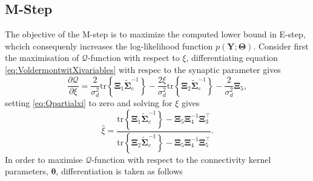 \documentclass[]{article}
\begin{document}
\subsection{M-Step}
The objective of the M-step is to maximize the computed lower bound in E-step, whcich consequenly increases the log-likelihood function $p(\mathbf Y;\boldsymbol\Theta)$.
                                                                                                                                                                                                                                                                                                                                                                                                                                                                            Consider first the maximisation of $\mathcal{Q}$-function with respect to $\xi$, differentiating equation \eqref{eq:VoldermontwitXivariables} with respec to the synaptic parameter gives
\begin{equation}\label{eq:Qpartialxi}
 \frac{\partial \mathcal Q}{\partial\xi}=\frac{2}{\sigma_d^2}\mathrm{tr}\left\lbrace \boldsymbol\Xi_1 \tilde{\boldsymbol\Sigma}_e^{-1}\right\rbrace -\frac{2\xi}{\sigma_d^2}\mathrm{tr}\left\lbrace \boldsymbol\Xi_2 \tilde{\boldsymbol\Sigma}_e^{-1}\right\rbrace-\frac{2}{\sigma_d^2}\boldsymbol\Xi_5,
\end{equation}
setting \eqref{eq:Qpartialxi} to zero and solving for $\xi$ gives
\begin{equation}\label{eq:xihat}
 \hat{\xi}=\frac{\mathrm{tr}\left\lbrace \boldsymbol\Xi_1 \tilde{\boldsymbol\Sigma}_e^{-1}\right\rbrace-\boldsymbol\Xi_5\boldsymbol\Xi_4^{-1}\boldsymbol\Xi_3^\top}{\mathrm{tr}\left\lbrace \boldsymbol\Xi_2 \tilde{\boldsymbol\Sigma}_e^{-1}\right\rbrace-\boldsymbol\Xi_5\boldsymbol\Xi_4^{-1}\boldsymbol\Xi_5^{\top}}.
\end{equation}
In order to maximise $\mathcal{Q}$-function with respect to the connectivity kernel parameters, $\boldsymbol\theta$, differentiation is taken as follows
\end{document}
